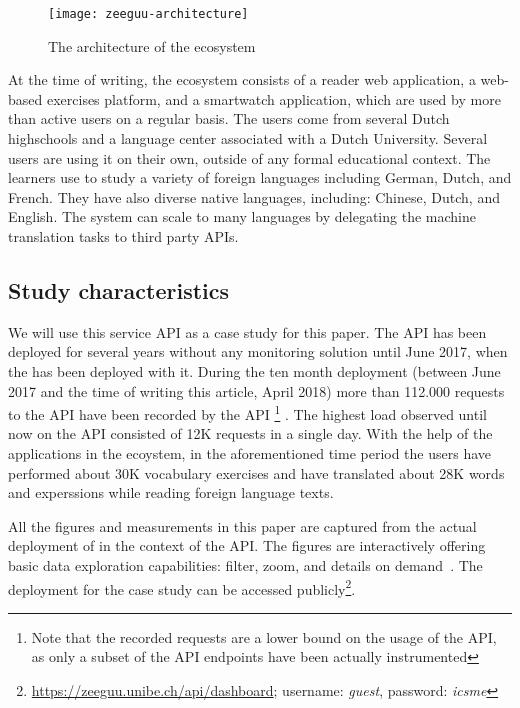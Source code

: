     \begin{figure}[h!]
      \centering
      \texttt{[image: zeeguu-architecture]}
      \caption{The architecture of the \zee ecosystem}
      \label{fig:zeeguuarch}
    \end{figure}  


  At the time of writing, the ecosystem consists of a reader web application, a web-based exercises platform, and a smartwatch application, which are used by more than \activeUserCount active users on a regular basis. The users come from several Dutch highschools and a language center associated with a Dutch University. Several users are using it on their own, outside of any formal educational context. The learners use \zee to study a variety of foreign languages including German, Dutch, and French. They have also diverse native languages, including: Chinese, Dutch, and English. The system can scale to many languages by delegating the machine translation tasks to third party APIs. 



\subsection{Study characteristics}

  We will use this \zee service API as a case study for this paper. 
  The API has been deployed for several years without any monitoring
  solution until June 2017, when the \tool has been deployed with it. 
  During the ten month deployment (between June 2017 and the time of writing this
  article, April 2018) more than 112.000 requests
  to the API have been recorded by the API \footnote{Note that the 
  recorded requests are a lower bound on the usage of the API, 
  as only a subset of the API endpoints have been actually instrumented} . The highest load observed 
  until now on the API consisted of 12K requests in a single day. 
  With the help of the applications in the ecoystem, in the aforementioned
  time period the users have 
  performed about 30K vocabulary exercises and have translated 
  about 28K words and experssions while reading foreign language 
  texts. 

  All the figures and measurements in this paper are captured from the actual deployment of \tool in the context of the \zee API. The figures are interactively offering basic data exploration capabilities: filter, zoom, and details on demand~\cite{Shne99a}. The \tool deployment for the case study can be accessed publicly\footnote{\url{https://zeeguu.unibe.ch/api/dashboard}; username: {\em guest}, password: {\em icsme}}. 


